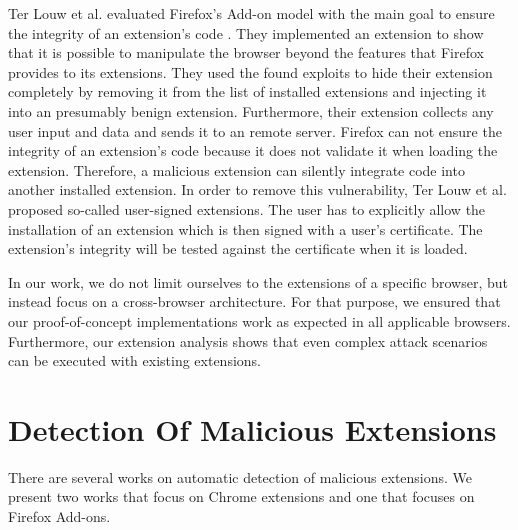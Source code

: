 	Ter Louw et al. evaluated Firefox's Add-on model with the main goal to ensure the integrity of an extension's code \cite{TerLouw:2007:EWB:1420581.1420583}. They implemented an extension to show that it is possible to manipulate the browser beyond the features that Firefox provides to its extensions. They used the found exploits to hide their extension completely by removing it from the list of installed extensions and injecting it into an presumably benign extension. Furthermore, their extension collects any user input and data and sends it to an remote server. Firefox can not ensure the integrity of an extension's code because it does not validate it when loading the extension. Therefore, a malicious extension can silently integrate code into another installed extension. In order to remove this vulnerability, Ter Louw et al. proposed so-called user-signed extensions. The user has to explicitly allow the installation of an extension which is then signed with a user's certificate. The extension's integrity will be tested against the certificate when it is loaded. 

	In our work, we do not limit ourselves to the extensions of a specific browser, but instead focus on a cross-browser architecture. For that purpose, we ensured that our proof-of-concept implementations work as expected in all applicable browsers. Furthermore, our extension analysis shows that even complex attack scenarios can be executed with existing extensions.
	
\section{Detection Of Malicious Extensions}
\label{sec:relatedWorks:detectionOfMaliciousExtensions} 
	
	There are several works on automatic detection of malicious extensions. We present two works that focus on Chrome extensions and one that focuses on Firefox Add-ons.
	
